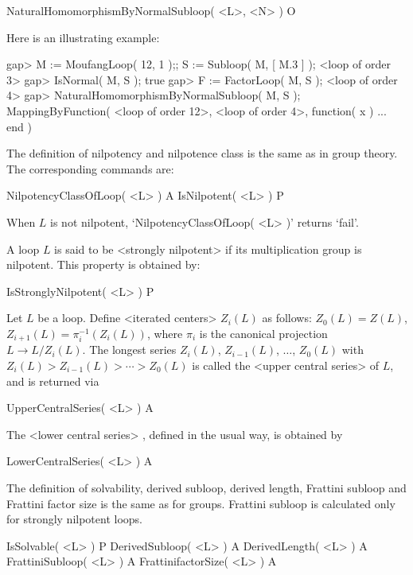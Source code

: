 \>NaturalHomomorphismByNormalSubloop( <L>, <N> ) O

Here is an illustrating example:

\beginexample
gap> M := MoufangLoop( 12, 1 );; S := Subloop( M, [ M.3 ] );
<loop of order 3>
gap> IsNormal( M, S );
true
gap> F := FactorLoop( M, S );
<loop of order 4>
gap> NaturalHomomorphismByNormalSubloop( M, S );
MappingByFunction( <loop of order 12>, <loop of order 4>,
    function( x ) ... end )
\endexample


The definition of nilpotency and nilpotence class is the same as in group
theory. The corresponding commands are:

\>NilpotencyClassOfLoop( <L> ) A
\>IsNilpotent( <L> ) P

When $L$ is not nilpotent, `NilpotencyClassOfLoop( <L> )' returns `fail'.

A loop $L$ is said to be <strongly nilpotent> if its multiplication group is nilpotent. This property is obtained by:

\>IsStronglyNilpotent( <L> ) P

Let $L$ be a loop. Define <iterated centers>
%
%
 $Z_i(L)$ as
follows: $Z_0(L)=Z(L)$, $Z_{i+1}(L) = \pi_i^{-1}( Z_i(L) )$, where $\pi_i$ is
the canonical projection $L\to L/Z_i(L)$. The longest series $Z_i(L)$,
$Z_{i-1}(L)$, $\dots$, $Z_0(L)$ with $Z_i(L)>Z_{i-1}(L)>\cdots >Z_0(L)$ is
called the <upper central series>
%
%
 of $L$, and is returned via

\>UpperCentralSeries( <L> ) A

The <lower central series>
%
%
, defined in the usual way, is obtained by

\>LowerCentralSeries( <L> ) A


The definition of solvability, derived subloop, derived length, Frattini
subloop and Frattini factor size is the same as for groups. Frattini subloop is
calculated only for strongly nilpotent loops.

\>IsSolvable( <L> ) P
\>DerivedSubloop( <L> ) A
\>DerivedLength( <L> ) A
\>FrattiniSubloop( <L> ) A
\>FrattinifactorSize( <L> ) A


